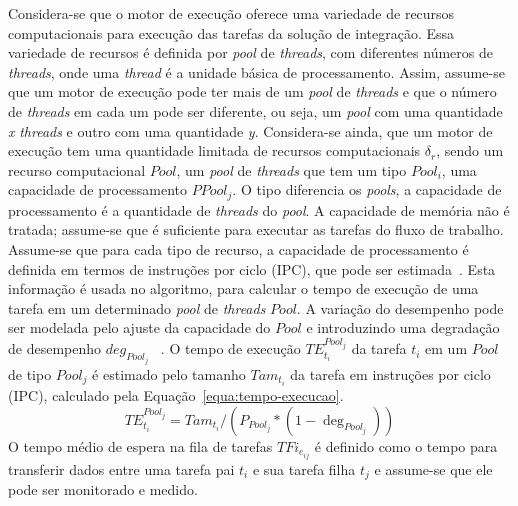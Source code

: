 \documentclass[sigconf]{acmart}
\begin{document}
 Considera-se que o motor de execução oferece uma variedade de recursos computacionais para execução das tarefas da solução de integração. Essa variedade de recursos é definida por \emph{pool} de \emph{threads}, com diferentes números de \emph{threads}, onde uma \emph{thread} é a unidade básica de processamento. Assim, assume-se que um motor de execução pode ter mais de um \emph{pool} de \emph{threads} e que o número de \emph{threads} em cada um pode ser diferente, ou seja, um \emph{pool} com uma quantidade \textit{x} \emph{threads} e outro com uma quantidade \textit{y}. Considera-se ainda, que um motor de execução tem uma quantidade limitada de recursos computacionais ${\delta _r}$, sendo um recurso computacional $Pool$, um \emph{pool} de \emph{threads} que tem um tipo $Pool _i$, uma capacidade de processamento $PPool_j$. O tipo diferencia os \emph{pools}, a capacidade de processamento é a quantidade de \emph{threads} do \emph{pool}. A capacidade de memória não é tratada; assume-se que é suficiente para executar as tarefas do fluxo de trabalho. Assume-se que para cada tipo de recurso, a capacidade de processamento é definida em termos de instruções por ciclo (IPC), que pode ser estimada~\cite{abraham2016runtime}. Esta informação é usada no algoritmo, para calcular o tempo de execução de uma tarefa em um determinado \emph{pool} de \emph{threads} $Pool$. A variação do desempenho pode ser modelada pelo ajuste da capacidade do $Pool$ e introduzindo uma degradação de desempenho $deg_{Pool_{j}}$ ~\cite{rodriguez2014}. 
 O tempo de execução $TE_{{t_i}}^{Poo{l_j}}$ da tarefa $t_i$ em um $Pool$ de tipo $Pool_j$ é estimado pelo tamanho $Ta{m_{{t_i}}}$ da tarefa em instruções por ciclo (IPC), calculado pela Equação~\ref{equa:tempo-execucao}. 
 \begin{equation}
 TE_{{t_i}}^{Pool_{j}} = Ta{m_{{t_i}}}/({P_{Pool_{j}}}*(1 - {\deg _{Pool_{j}}}))
 \label{equa:tempo-execucao}
 \end{equation}
 O tempo médio de espera na fila de tarefas $TF{i_{e_{ij}}}$ é definido como o tempo para transferir dados entre uma tarefa pai $t_i$ e sua tarefa filha $t_j$ e assume-se que ele pode ser monitorado e medido.  
 
\end{document}
